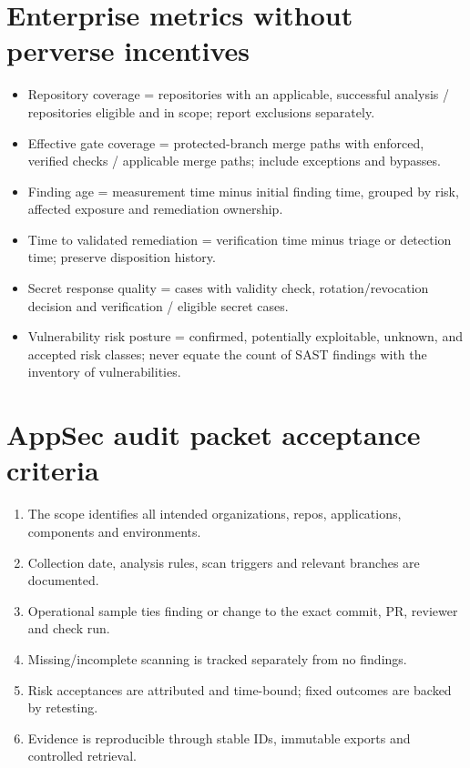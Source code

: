 \documentclass[10pt,oneside]{report}
\begin{document}
\chapter{Enterprise metrics without perverse incentives}
\begin{itemize}
\item Repository coverage = repositories with an applicable, successful analysis / repositories eligible and in scope; report exclusions separately.
\item Effective gate coverage = protected-branch merge paths with enforced, verified checks / applicable merge paths; include exceptions and bypasses.
\item Finding age = measurement time minus initial finding time, grouped by risk, affected exposure and remediation ownership.
\item Time to validated remediation = verification time minus triage or detection time; preserve disposition history.
\item Secret response quality = cases with validity check, rotation/revocation decision and verification / eligible secret cases.
\item Vulnerability risk posture = confirmed, potentially exploitable, unknown, and accepted risk classes; never equate the count of SAST findings with the inventory of vulnerabilities.
\end{itemize}

\chapter{AppSec audit packet acceptance criteria}
\begin{enumerate}
\item The scope identifies all intended organizations, repos, applications, components and environments.
\item Collection date, analysis rules, scan triggers and relevant branches are documented.
\item Operational sample ties finding or change to the exact commit, PR, reviewer and check run.
\item Missing/incomplete scanning is tracked separately from no findings.
\item Risk acceptances are attributed and time-bound; fixed outcomes are backed by retesting.
\item Evidence is reproducible through stable IDs, immutable exports and controlled retrieval.
\end{enumerate}
\end{document}
